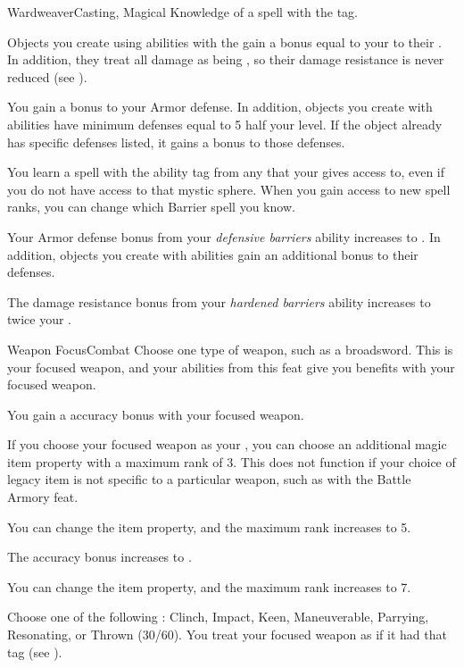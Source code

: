   \begin{magicalfeat}{Wardweaver}{Casting, Magical}
    \featpre Knowledge of a spell with the  tag.

     Objects you create using abilities with the   gain a bonus equal to your  to their .
    In addition, they treat all damage as being , so their damage resistance is never reduced (see ).

     You gain a  bonus to your Armor defense.
    In addition, objects you create with  abilities have minimum defenses equal to 5 \add half your level.
    If the object already has specific defenses listed, it gains a  bonus to those defenses.

     You learn a spell with the  ability tag from any  that your  gives access to, even if you do not have access to that mystic sphere.
    When you gain access to new spell ranks, you can change which Barrier spell you know.

     Your Armor defense bonus from your \textit{defensive barriers} ability increases to .
    In addition, objects you create with  abilities gain an additional  bonus to their defenses.

     The damage resistance bonus from your \textit{hardened barriers} ability increases to twice your .
  \end{magicalfeat}

  \begin{feat}{Weapon Focus}{Combat}
     Choose one type of weapon, such as a broadsword.
    This is your focused weapon, and your abilities from this feat give you benefits with your focused weapon.

     You gain a  accuracy bonus with your focused weapon.

     If you choose your focused weapon as your , you can choose an additional magic item property with a maximum rank of 3.
    This does not function if your choice of legacy item is not specific to a particular weapon, such as with the Battle Armory feat.

     You can change the item property, and the maximum rank increases to 5.

     The accuracy bonus increases to .

     You can change the item property, and the maximum rank increases to 7.

     Choose one of the following : Clinch, Impact, Keen, Maneuverable, Parrying, Resonating, or Thrown (30/60).
    You treat your focused weapon as if it had that tag (see ).
  \end{feat}

